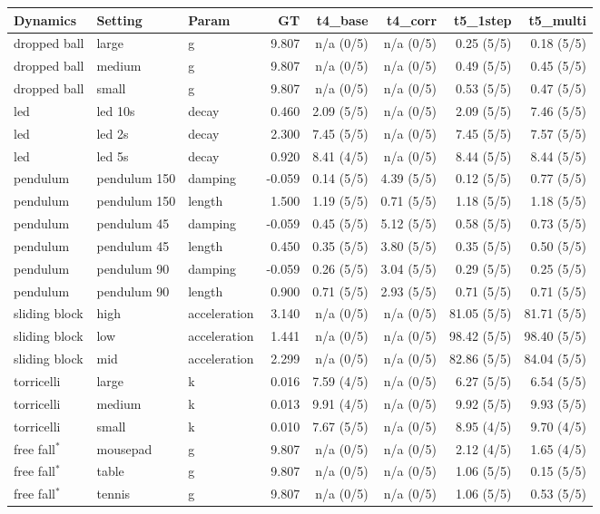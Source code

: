 \begin{tabular}{lll r r r r r}
\toprule
Dynamics & Setting & Param & GT & t4_base & t4_corr & t5_1step & t5_multi \\
\midrule
dropped ball & large & g & 9.807 & n/a (0/5) & n/a (0/5) & 0.25 (5/5) & 0.18 (5/5) \\
dropped ball & medium & g & 9.807 & n/a (0/5) & n/a (0/5) & 0.49 (5/5) & 0.45 (5/5) \\
dropped ball & small & g & 9.807 & n/a (0/5) & n/a (0/5) & 0.53 (5/5) & 0.47 (5/5) \\
led & led 10s & decay & 0.460 & 2.09 (5/5) & n/a (0/5) & 2.09 (5/5) & 7.46 (5/5) \\
led & led 2s & decay & 2.300 & 7.45 (5/5) & n/a (0/5) & 7.45 (5/5) & 7.57 (5/5) \\
led & led 5s & decay & 0.920 & 8.41 (4/5) & n/a (0/5) & 8.44 (5/5) & 8.44 (5/5) \\
pendulum & pendulum 150 & damping & -0.059 & 0.14 (5/5) & 4.39 (5/5) & 0.12 (5/5) & 0.77 (5/5) \\
pendulum & pendulum 150 & length & 1.500 & 1.19 (5/5) & 0.71 (5/5) & 1.18 (5/5) & 1.18 (5/5) \\
pendulum & pendulum 45 & damping & -0.059 & 0.45 (5/5) & 5.12 (5/5) & 0.58 (5/5) & 0.73 (5/5) \\
pendulum & pendulum 45 & length & 0.450 & 0.35 (5/5) & 3.80 (5/5) & 0.35 (5/5) & 0.50 (5/5) \\
pendulum & pendulum 90 & damping & -0.059 & 0.26 (5/5) & 3.04 (5/5) & 0.29 (5/5) & 0.25 (5/5) \\
pendulum & pendulum 90 & length & 0.900 & 0.71 (5/5) & 2.93 (5/5) & 0.71 (5/5) & 0.71 (5/5) \\
sliding block & high & acceleration & 3.140 & n/a (0/5) & n/a (0/5) & 81.05 (5/5) & 81.71 (5/5) \\
sliding block & low & acceleration & 1.441 & n/a (0/5) & n/a (0/5) & 98.42 (5/5) & 98.40 (5/5) \\
sliding block & mid & acceleration & 2.299 & n/a (0/5) & n/a (0/5) & 82.86 (5/5) & 84.04 (5/5) \\
torricelli & large & k & 0.016 & 7.59 (4/5) & n/a (0/5) & 6.27 (5/5) & 6.54 (5/5) \\
torricelli & medium & k & 0.013 & 9.91 (4/5) & n/a (0/5) & 9.92 (5/5) & 9.93 (5/5) \\
torricelli & small & k & 0.010 & 7.67 (5/5) & n/a (0/5) & 8.95 (4/5) & 9.70 (4/5) \\
free fall$^\ast$ & mousepad & g & 9.807 & n/a (0/5) & n/a (0/5) & 2.12 (4/5) & 1.65 (4/5) \\
free fall$^\ast$ & table & g & 9.807 & n/a (0/5) & n/a (0/5) & 1.06 (5/5) & 0.15 (5/5) \\
free fall$^\ast$ & tennis & g & 9.807 & n/a (0/5) & n/a (0/5) & 1.06 (5/5) & 0.53 (5/5) \\
\bottomrule
\end{tabular}
